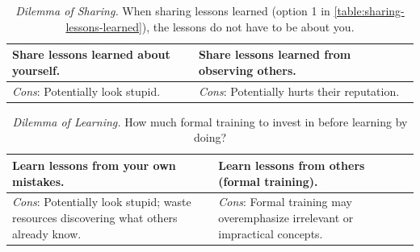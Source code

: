 

\begin{center}
\begin{table}[H] %
\begin{tabular}{ | m{\dilemmatablewidth}| m{\dilemmatablewidth} | } 
  \hline
  \textbf{Share lessons learned about yourself.} & 
  \textbf{Share lessons learned from observing others.} \\ 
  \hline
  \textit{Cons}: Potentially look stupid. & 
  \textit{Cons}: Potentially hurts their reputation. \\  
  \hline
\end{tabular}
\caption{
\textit{Dilemma of Sharing.}
When sharing lessons learned (option 1 in \ref{table:sharing-lessons-learned}), the lessons do not have to be about you. 
}
\label{table:share-lessons-learned}
\end{table}
\end{center}



\begin{center}
\begin{table}[H] %
\begin{tabular}{ | m{\dilemmatablewidth}| m{\dilemmatablewidth} | } 
  \hline
  \textbf{Learn lessons from your own mistakes.} & 
  \textbf{Learn lessons from others (formal training).} \\ 
  \hline
  \textit{Cons}: Potentially look stupid; waste resources discovering what others already know. & 
  \textit{Cons}: Formal training may overemphasize irrelevant or impractical concepts. \\  
  \hline
\end{tabular}
\caption{
\textit{Dilemma of Learning.}
How much formal training to invest in before learning by doing?
}
\label{table:lessons-learned-source}
\end{table}
\end{center}

